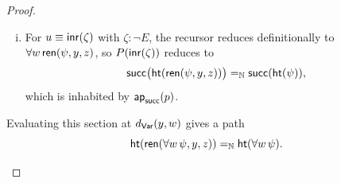 \begin{proof}
\begin{itemize}
\begin{enumerate}[i)]
            \item For $u\equiv\mathsf{inr}(\zeta)$ with $\zeta\colon\neg E$, the recursor reduces definitionally to $\forall w\,\mathsf{ren}(\psi,y,z)$, so $P(\mathsf{inr}(\zeta))$ reduces to
            \[
                \mathsf{succ}\bigl(
                    \mathsf{ht}(\mathsf{ren}(\psi,y,z))
                \bigr)
                \mathrel{=_{\mathbb{N}}}
                \mathsf{succ}(\mathsf{ht}(\psi)),
            \]
            which is inhabited by $\mathsf{ap}_{\mathsf{succ}}(p)$.
        \end{enumerate}
        Evaluating this section at $d_{\mathsf{Var}}(y,w)$ gives a path
        \[
            \mathsf{ht}(
                \mathsf{ren}(\forall w\,\psi,y,z)
            )
            \mathrel{=_{\mathbb{N}}}
            \mathsf{ht}(\forall w\,\psi).
        \]
    \end{itemize}
\end{proof}


